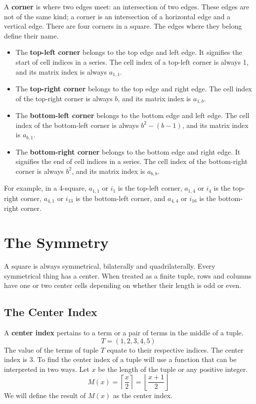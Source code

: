 \documentclass[letterpaper, twoside,12pt]{article}
\begin{document}
    A \textbf{corner} is where two edges meet: an intersection of two edges. These edges are not of the same kind; a corner is an intersection of a horizontal edge and a vertical edge. There are four corners in a square. The edges where they belong define their name.
    \begin{itemize}
        \item The \textbf{top-left corner} belongs to the top edge and left edge. It signifies the start of cell indices in a series. The cell index of a top-left corner is always 1, and its matrix index is always $a_{1,1}$.
        \item The \textbf{top-right corner} belongs to the top edge and right edge. The cell index of the top-right corner is always $b$, and its matrix index is $a_{1,b}$.
        \item The \textbf{bottom-left corner} belongs to the bottom edge and left edge. The cell index of the bottom-left corner is always $b^2 - (b - 1)$, and its matrix index is $a_{b,1}$.
        \item The \textbf{bottom-right corner} belongs to the bottom edge and right edge. It signifies the end of cell indices in a series. The cell index of the bottom-right corner is always $b^2$, and its matrix index is $a_{b,b}$.
    \end{itemize}

    For example, in a 4-square, $a_{1,1}$ or $i_1$ is the top-left corner, $a_{1,4}$ or $i_4$ is the top-right corner, $a_{4,1}$ or $i_{13}$ is the bottom-left corner, and $a_{4,4}$ or $i_{16}$ is the bottom-right corner.

    \newpage

    \section{The Symmetry} \label{symmetry}
    A square is always symmetrical, bilaterally and quadrilaterally. Every symmetrical thing has a center. When treated as a finite tuple, rows and columns have one or two center cells depending on whether their length is odd or even.

    \subsection{The Center Index} \label{center_index}
    A \textbf{center index} pertains to a term or a pair of terms in the middle of a tuple.
    \begin{equation*}
        T = (1,2,3,4,5)
    \end{equation*}
    The value of the terms of tuple $T$ equate to their respective indices. The center index is 3. To find the center index of a tuple will use a function that can be interpreted in two ways. Let $x$ be the length of the tuple or any positive integer.
    \begin{equation}
        M(x) = \left\lceil \frac{x}{2} \right\rceil = \left\lfloor \frac{x+1}{2} \right\rfloor
    \end{equation}
    We will define the result of $M(x)$ as the center index. 
\end{document}
